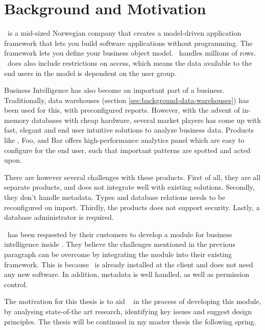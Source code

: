 \section{Background and Motivation}
\label{sec:background-and-motivation}

\genus~is a mid-sized Norwegian company that creates a model-driven application framework that lets you build software applications without programming. The framework lets you define your business object model. \genusSoftware~handles millions of rows. \genusSoftware~does also include restrictions on access, which means the data available to the end users in the model is dependent on the user group.

Business Intelligence has also become an important part of a business. Traditionally, data warehouses (section \ref{sec:background-data-warehouses}) has been used for this, with preconfigured reports. However, with the advent of in-memory databases with cheap hardware, several market players has come up with fast, elegant and end user intuitive solutions to analyze business data. Products like \qlikview, Foo, and Bar offers high-performance analytics panel which are easy to configure for the end user, such that important patterns are spotted and acted upon.

There are however several challenges with these products. First of all, they are all separate products, and does not integrate well with existing solutions. Secondly, they don't handle metadata. Types and database relations needs to be reconfigured on import. Thirdly, the products does not support security. Lastly, a database administrator is required.

\genus~has been requested by their customers to develop a module for business intelligence inside \genusSoftware . They believe the challenges mentioned in the previous paragraph can be overcome by integrating the module into their existing framework. This is because \genusSoftware~is already installed at the client and does not need any new software. In addition, metadata is well handled, as well as permission control. 

The motivation for this thesis is to aid \genus~ in the process of developing this module, by analysing state-of-the art research, identifying key issues and suggest design principles. The thesis will be continued in my master thesis the following spring.
